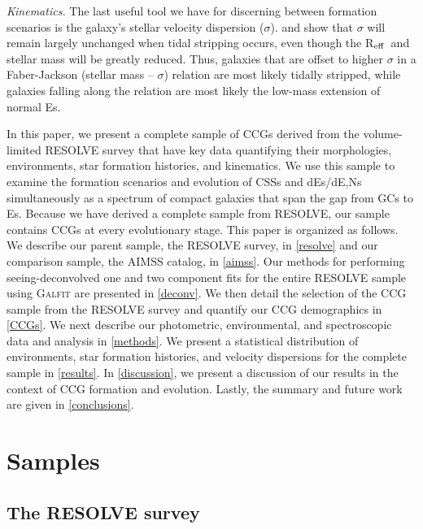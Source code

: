 \documentclass[iop,apj]{emulateapj}
\newcommand{\Reff}{R$_{\rm eff}$}
\begin{document}
\textit{Kinematics.}  The last useful tool we have for discerning between formation scenarios is the galaxy's stellar velocity dispersion ($\sigma$). \citet{Bender1992} and \citet{Bekki2003} show that $\sigma$ will remain largely unchanged when tidal stripping occurs, even though the \Reff\ and stellar mass will be greatly reduced. Thus, galaxies that are offset to higher $\sigma$ in a Faber-Jackson (stellar mass -- $\sigma$) relation \citep{faber1976} are most likely tidally stripped, while galaxies falling along the relation are most likely the low-mass extension of normal Es.

In this paper, we present a complete sample of CCGs derived from the volume-limited RESOLVE survey that have key data quantifying their morphologies, environments, star formation histories, and kinematics. We use this sample to examine the formation scenarios and evolution of CSSs and dEs/dE,Ns simultaneously as a spectrum of compact galaxies that span the gap from GCs to Es. Because we have derived a complete sample from RESOLVE, our sample contains CCGs at every evolutionary stage. This paper is organized as follows. We describe our parent sample, the RESOLVE survey, in \autoref{resolve} and our comparison sample, the AIMSS catalog, in \autoref{aimss}. Our methods for performing seeing-deconvolved one and two component fits for the entire RESOLVE sample using \textsc{Galfit} are presented in \autoref{deconv}. We then detail the selection of the CCG sample from the RESOLVE survey and quantify our CCG demographics in \autoref{CCGs}. We next describe our photometric, environmental, and spectroscopic data and analysis in \autoref{methods}. We present a statistical distribution of environments, star formation histories, and velocity dispersions for the complete sample in \autoref{results}. In \autoref{discussion}, we present a discussion of our results in the context of CCG formation and evolution. Lastly, the summary and future work are given in \autoref{conclusions}.

\section{Samples}
\label{samples}

\subsection{The RESOLVE survey}
\label{resolve}
\end{document}
